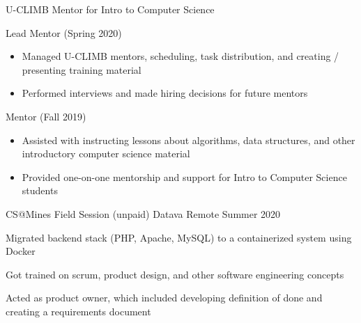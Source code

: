 \begin{cventries}
    \vspace{-1.0mm}
    \cventry
    	{U-CLIMB Mentor for Intro to Computer Science}
    	{}
    	{ }
	   	 {}
   	 {
   	 \begin{cvitems}
         \item {Lead Mentor (Spring 2020)}
         \begin{itemize}
         \item {Managed U-CLIMB mentors, scheduling, task
    	distribution, and creating /
      presenting training material}
          \item {Performed interviews and made hiring decisions for future mentors}
         \end{itemize}
         \ifcv
         \item {Mentor (Fall 2019)}
         \begin{itemize}
            	 \item {Assisted with instructing lessons about algorithms, data structures, and other introductory computer science material}
   	         \item {Provided one-on-one mentorship and support for Intro to Computer Science students}
        \end{itemize}
        \fi
      \end{cvitems}
      }
      {}

      \ifcv
    \cventry
    {CS@Mines Field Session (unpaid)}
    {Datava}
    {Remote}
    {Summer 2020}
    {
      \begin{cvitems}
        \item Migrated backend stack (PHP, Apache, MySQL) to a containerized system using Docker
        \item Got trained on scrum, product design, and other software engineering concepts
        \item Acted as product owner, which included developing definition of done and creating a requirements document
      \end{cvitems}
    }
    {}

    


\end{cventries}
